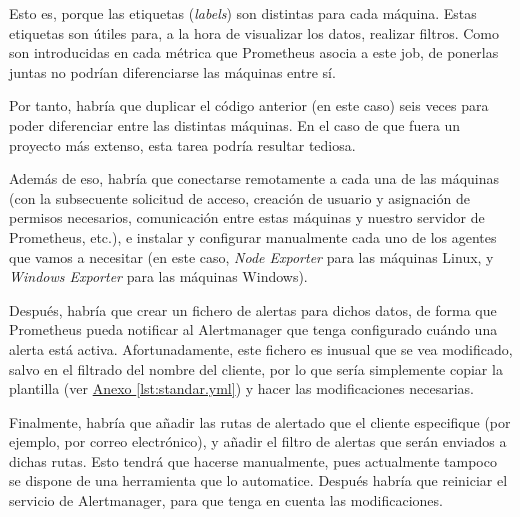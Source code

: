 Esto es, porque las etiquetas (\textit{labels}) son distintas para cada máquina. Estas etiquetas son útiles para, a la hora de visualizar los datos, realizar filtros. Como son introducidas en cada métrica que Prometheus asocia a este job, de ponerlas juntas no podrían diferenciarse las máquinas entre sí.

Por tanto, habría que duplicar el código anterior (en este caso) seis veces para poder diferenciar entre las distintas máquinas. En el caso de que fuera un proyecto más extenso, esta tarea podría resultar tediosa.

Además de eso, habría que conectarse remotamente a cada una de las máquinas (con la subsecuente solicitud de acceso, creación de usuario y asignación de permisos necesarios, comunicación entre estas máquinas y nuestro servidor de Prometheus, etc.), e instalar y configurar manualmente cada uno de los agentes que vamos a necesitar (en este caso, \textit{Node Exporter} para las máquinas Linux, y \textit{Windows Exporter} para las máquinas Windows).

Después, habría que crear un fichero de alertas para dichos datos, de forma que Prometheus pueda notificar al Alertmanager que tenga configurado cuándo una alerta está activa. Afortunadamente, este fichero es inusual que se vea modificado, salvo en el filtrado del nombre del cliente, por lo que sería simplemente copiar la plantilla (ver \hyperref[lst:standar.yml]{Anexo \ref{lst:standar.yml}}) y hacer las modificaciones necesarias.

Finalmente, habría que añadir las rutas de alertado que el cliente especifique (por ejemplo, por correo electrónico), y añadir el filtro de alertas que serán enviados a dichas rutas. Esto tendrá que hacerse manualmente, pues actualmente tampoco se dispone de una herramienta que lo automatice. Después habría que reiniciar el servicio de Alertmanager, para que tenga en cuenta las modificaciones.